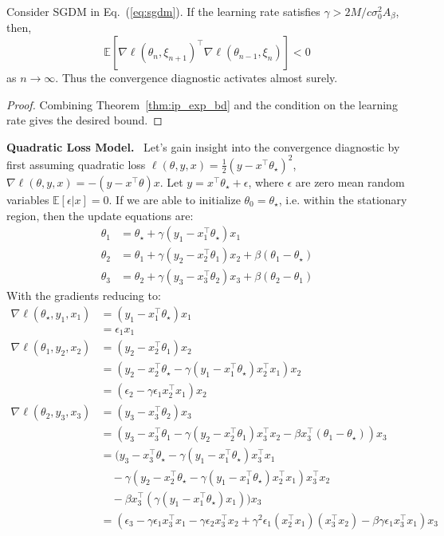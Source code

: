 \documentclass[conference]{IEEEtran}
\newcommand{\Ex}[1]{\mathbb{E}[ #1 ]}
\newenvironment{customcor}[1]
   {\renewcommand\theinnercustomcor{#1}\innercustomcor}
   {\endinnercustomcor}
\begin{document}
\begin{customcor}{\ref{cor:ip_exp_neg}}
Consider SGDM in Eq.~(\ref{eq:sgdm}). If
the learning rate satisfies $\gamma > 2 M / c \sigma_0^2 A_\beta$, then, 
\begin{equation*}
\mathbb{E} [ \nabla \ell ( \theta_n, \xi_{n+1} )^\top \nabla \ell ( \theta_{n-1}, \xi_n ) ] 
< 0
\end{equation*}
as $n \rightarrow \infty$.
Thus the convergence diagnostic activates almost surely.
\end{customcor}
\begin{proof}
Combining Theorem~\ref{thm:ip_exp_bd} and the condition on the learning rate gives the desired bound.
\end{proof}

\noindent\textbf{Quadratic Loss Model.} \  Let's gain insight into the convergence diagnostic by first assuming quadratic loss $\ell ( \theta, y, x ) = \frac{1}{2} ( y - x^\top \theta_\star )^2$, $\nabla \ell ( \theta, y, x ) = - ( y - x^\top \theta) x$. Let $y = x^\top \theta_\star + \epsilon$, where $\epsilon$ are zero mean random variables $\Ex{ \epsilon | x } = 0$.
If we are able to initialize $\theta_0 = \theta_\star$, i.e. within the stationary region, then the update equations are:
\begin{align*}
\theta_1 &= \theta_\star + \gamma ( y_1 - x_1^\top \theta_\star ) x_1 \\
\theta_2 &= \theta_1 + \gamma ( y_2 - x_2^\top \theta_1 ) x_2 + \beta ( \theta_1 - \theta_\star ) \\
\theta_3 &= \theta_2 + \gamma ( y_3 - x_3^\top \theta_2 ) x_3 + \beta ( \theta_2 - \theta_1 )
\end{align*}
With the gradients reducing to:
\begin{align*}
\nabla \ell ( \theta_\star, y_1, x_1 ) &= ( y_1 - x_1^\top \theta_\star ) x_1 \\
&=  \epsilon_1 x_1\\
\nabla \ell ( \theta_1, y_2, x_2 ) &= ( y_2 - x_2^\top \theta_1 ) x_2 \\
&= ( y_2 - x_2^\top \theta_\star - \gamma ( y_1 - x_1^\top \theta_\star ) x_2^\top x_1 ) x_2 \\
&= ( \epsilon_2 - \gamma \epsilon_1 x_2^\top x_1 ) x_2 \\
\nabla \ell ( \theta_2, y_3, x_3 ) &= ( y_3 - x_3^\top \theta_2 ) x_3 \\
&= ( y_3 - x_3^\top \theta_1 - \gamma ( y_2 - x_2^\top \theta_1 ) x_3^\top x_2 - \beta x_3^\top ( \theta_1 - \theta_\star ) ) x_3 \\
&= ( y_3 - x_3^\top \theta_\star - \gamma ( y_1 - x_1^\top \theta_\star ) x_3^\top x_1 \\
&\quad - \gamma ( y_2 - x_2^\top \theta_\star - \gamma ( y_1 - x_1^\top \theta_\star ) x_2^\top x_1 ) x_3^\top x_2 \\
&\quad - \beta x_3^\top ( \gamma ( y_1 - x_1^\top \theta_\star ) x_1 ) ) x_3 \\
&= ( \epsilon_3 - \gamma \epsilon_1 x_3^\top x_1 - \gamma \epsilon_2 x_3^\top x_2 + \gamma^2 \epsilon_1 ( x_2^\top x_1 ) ( x_3^\top x_2 ) - \beta \gamma \epsilon_1 x_3^\top x_1 ) x_3
\end{align*}
\end{document}
